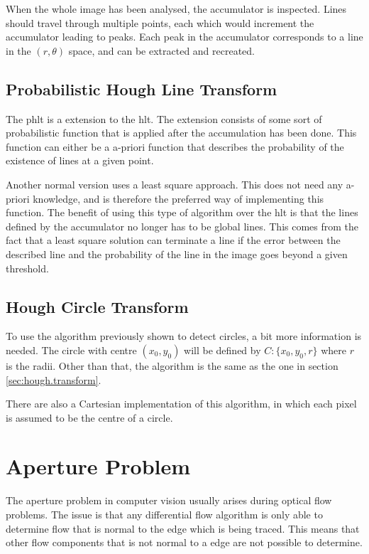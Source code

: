 When the whole image has been analysed, the accumulator is inspected. Lines should travel through multiple points, 
each which would increment the accumulator leading to peaks. Each peak in the accumulator corresponds to 
a line in the $(r, \theta)$ space, and can be extracted and recreated.

\subsection{Probabilistic Hough Line Transform}\label{sec:hough.transform.prob}
The \gls{phlt} is a extension to the \gls{hlt}. The extension consists of 
some sort of probabilistic function that is applied after the accumulation has been done. This 
function can either be a a-priori function 
that describes the probability of the existence of lines at a given point. 

Another 
normal version uses a least square approach. This does not need any a-priori knowledge,
and is therefore the preferred way of implementing this function. The 
benefit of using this type of algorithm over the \gls{hlt} is that 
the lines defined by the accumulator no longer has to be global lines. This 
comes from the fact that a least square solution can terminate a line if the error between the described 
line and the probability of the line in the image goes beyond a given threshold. 


\subsection{Hough Circle Transform}\label{sec:hough.circles}
To use the algorithm previously shown to detect circles, a bit more information is needed. 
The circle with centre $(x_0,y_0)$ will be defined by $C:\{x_0,y_0,r\}$ where $r$ is the radii.
Other than that, the algorithm is the same as the one in section \vref{sec:hough.transform}.

There are also a Cartesian implementation of this algorithm, in which each pixel is assumed to 
be the centre of a circle. 


\section{Aperture Problem}\label{sec:aperture.problem}
The aperture problem in computer vision usually arises during optical flow problems. The issue is that 
any differential flow algorithm is only able to determine flow that is normal to the edge which is being traced.
This means that other flow components that is not normal to a edge are not possible to determine.


